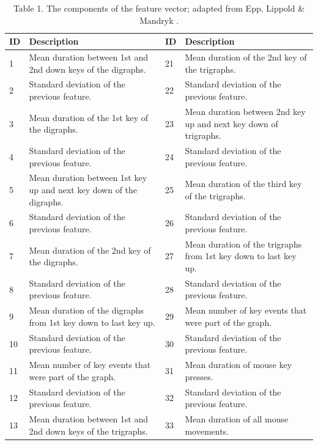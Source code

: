 \documentclass[conference]{IEEEtran}
\begin{document}
\begin{table}[!t]
\centering
\caption{Table 1. The components of the feature vector; adapted from Epp, Lippold \& Mandryk \cite{epp2011identifying}.}
    \begin{tabular}{ | l | l || l | l | }
    \hline
    ID          & Description           & ID               & Description  \\
    \hline
    1 & Mean duration between 1st and 2nd down keys of the digraphs.  & 21 & Mean duration of the 2nd key of the trigraphs.\\
    \hline
    2 & Standard deviation of the previous feature.                   & 22 & Standard deviation of the previous feature.\\
    \hline
    3 & Mean duration of the 1st key of the digraphs.                 & 23 & Mean duration between 2nd key up and next key down of trigraphs.\\
    \hline
    4 & Standard deviation of the previous feature.                   & 24 & Standard deviation of the previous feature.\\
    \hline
    5 & Mean duration between 1st key up and next key down of the digraphs. & 25 & Mean duration of the third key of the trigraphs.\\
    \hline
    6 & Standard deviation of the previous feature. & 26 & Standard deviation of the previous feature.\\
    \hline
    7 & Mean duration of the 2nd key of the digraphs. & 27 & Mean duration of the trigraphs from 1st key down to last key up.\\
    \hline
    8 & Standard deviation of the previous feature. & 28 & Standard deviation of the previous feature.\\
    \hline
    9 & Mean duration of the digraphs from 1st key down to last key up. & 29 & Mean number of key events that were part of the graph.\\
    \hline
    10 & Standard deviation of the previous feature. & 30 & Standard deviation of the previous feature.\\
    \hline
    11 & Mean number of key events that were part of the graph. & 31 & Mean duration of mouse key presses.\\
    \hline
    12 & Standard deviation of the previous feature. & 32 & Standard deviation of the previous feature.\\
    \hline
    13 & Mean duration between 1st and 2nd down keys of the trigraphs. & 33 & Mean duration of all mouse movements.\\

\end{tabular}
\end{table}
\end{document}

